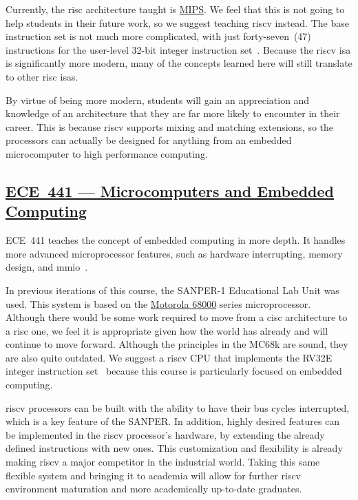 Currently, the \Gls{risc} architecture taught is \href{https://en.wikipedia.org/wiki/MIPS_architecture}{MIPS}.
We feel that this is not going to help students in their future work, so we suggest teaching \Gls{riscv} instead.
The base instruction set is not much more complicated, with just forty-seven~(47) instructions for the user-level 32-bit integer instruction set~\cite[pp.~9--26]{riscvISASpec}.
Because the \Gls{riscv} \Gls{isa} is significantly more modern, many of the concepts learned here will still translate to other \Gls{risc} \Glspl{isa}.

By virtue of being more modern, students will gain an appreciation and knowledge of an architecture that they are far more likely to encounter in their career.
This is because \Gls{riscv} supports mixing and matching extensions, so the processors can actually be designed for anything from an embedded microcomputer to high performance computing.

\subsection{\href{http://bulletin.iit.edu/search/?P=ECE 441}{ECE~441 --- Microcomputers and Embedded Computing}}\label{sec:ECE_441}
ECE~441 teaches the concept of embedded computing in more depth.
It handles more advanced microprocessor features, such as hardware interrupting, memory design, and \Gls{mmio}~\cite{iitECE441}.

In previous iterations of this course, the SANPER-1 Educational Lab Unit was used.
This system is based on the \href{https://en.wikipedia.org/wiki/Motorola_68000}{Motorola 68000} series microprocessor.
Although there would be some work required to move from a \Gls{cisc} architecture to a \Gls{risc} one, we feel it is appropriate given how the world has already and will continue to move forward.
Although the principles in the MC68k are sound, they are also quite outdated.
We suggest a \Gls{riscv} CPU that implements the RV32E integer instruction set~\cite[p.~25]{riscvISASpec} because this course is particularly focused on embedded computing.

\Gls{riscv} processors can be built with the ability to have their bus cycles interrupted, which is a key feature of the SANPER.\@
In addition, highly desired features can be implemented in the \Gls{riscv} processor's hardware, by extending the already defined instructions with new ones.
This customization and flexibility is already making \Gls{riscv} a major competitor in the industrial world.
Taking this same flexible system and bringing it to academia will allow for further \Gls{riscv} environment maturation and more academically up-to-date graduates.

